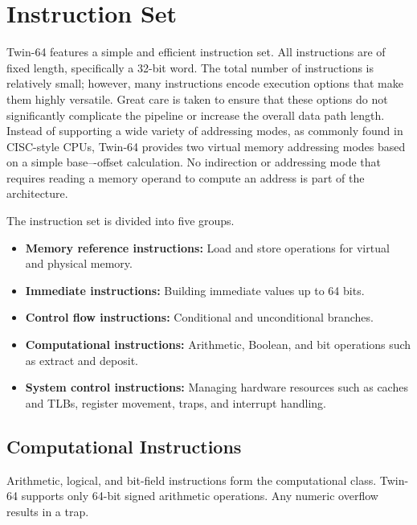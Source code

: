 %
%
\chapter*{Instruction Set}

Twin-64 features a simple and efficient instruction set. All instructions are of fixed length, specifically a 32-bit word. The total number of instructions is relatively small; however, many instructions encode execution options that make them highly versatile. Great care is taken to ensure that these options do not significantly complicate the pipeline or increase the overall data path length. Instead of supporting a wide variety of addressing modes, as commonly found in CISC-style CPUs, Twin-64 provides two virtual memory addressing modes based on a simple base–-offset calculation. No indirection or addressing mode that requires reading a memory operand to compute an address is part of the architecture.

The instruction set is divided into five groups.  
\begin{itemize}
  \item \textbf{Memory reference instructions:} Load and store operations for virtual and physical memory.  
  \item \textbf{Immediate instructions:} Building immediate values up to 64 bits.  
  \item \textbf{Control flow instructions:} Conditional and unconditional branches.  
  \item \textbf{Computational instructions:} Arithmetic, Boolean, and bit operations such as extract and deposit.  
  \item \textbf{System control instructions:} Managing hardware resources such as caches and TLBs, register movement, traps, and interrupt handling.  
\end{itemize}





\section*{Computational Instructions}

Arithmetic, logical, and bit-field instructions form the computational class. Twin-64 supports only 64-bit signed arithmetic operations. Any numeric overflow results in a trap.

